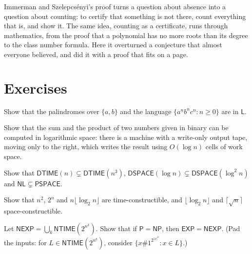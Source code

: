 \begin{beauty}
Immerman and Szelepcsényi's proof turns a question about absence into a question about counting: to certify that something is not there, count everything that is, and show it. The same idea, counting as a certificate, runs through mathematics, from the proof that a polynomial has no more roots than its degree to the class number formula. Here it overturned a conjecture that almost everyone believed, and did it with a proof that fits on a page.
\end{beauty}

\section{Exercises}

\begin{exercise}[$\star$]\label{ex:logspace}
Show that the palindromes over $\{a,b\}$ and the language $\{a^nb^nc^n:n\ge0\}$ are in $\mathsf L$.
\end{exercise}

\begin{exercise}[$\star\star$]\label{ex:logarith}
Show that the sum and the product of two numbers given in binary can be computed in logarithmic space: there is a machine with a write-only output tape, moving only to the right, which writes the result using $O(\log n)$ cells of work space.
\end{exercise}

\begin{exercise}[$\star$]\label{ex:hierarchyexamples}
Show that $\mathsf{DTIME}(n)\subsetneq\mathsf{DTIME}(n^3)$, $\mathsf{DSPACE}(\log n)\subsetneq\mathsf{DSPACE}(\log^2n)$ and $\mathsf{NL}\subsetneq\mathsf{PSPACE}$.
\end{exercise}

\begin{exercise}[$\star\star$]\label{ex:constructible}
Show that $n^2$, $2^n$ and $n\lfloor\log_2n\rfloor$ are time-constructible, and $\lfloor\log_2n\rfloor$ and $\lceil\sqrt n\rceil$ space-constructible.
\end{exercise}

\begin{exercise}[$\star\star$]\label{ex:padding}
Let $\mathsf{NEXP}=\bigcup_k\mathsf{NTIME}(2^{n^k})$. Show that if $\mathsf P=\mathsf{NP}$, then $\mathsf{EXP}=\mathsf{NEXP}$. (Pad the inputs: for $L\in\mathsf{NTIME}(2^{n^k})$, consider $\{x\#1^{2^{|x|^k}}:x\in L\}$.)
\end{exercise}

